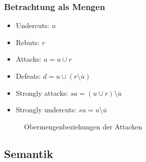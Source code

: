 \documentclass[nonacm=true, language=german]{acmart}
\begin{document}
\subsubsection{Betrachtung als Mengen}

\begin{itemize}
    \item Undercuts: $u$
    \item Rebuts: $r$
    \item Attacks: $ a = u \cup r $
    \item Defeats: $ d = u \cup (r  \setminus \overline{u}) $
    \item Strongly attacks: $ sa = (u \cup r) \setminus \overline{u} $
    \item Strongly undercuts: $ su = u \setminus \overline{u} $
\end{itemize}

\begin{figure}[ht]
    \centering
    \caption{Obermengenbeziehungen der Attacken}
    \label{fig:supset_attacks}
\end{figure}

\subsection{Semantik}
\end{document}

